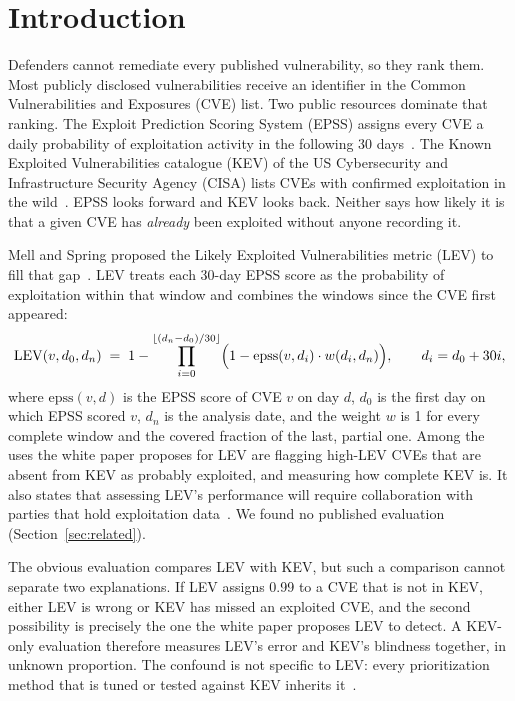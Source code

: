 
\section{Introduction}\label{sec:intro}

Defenders cannot remediate every published vulnerability, so they rank them.
Most publicly disclosed vulnerabilities receive an identifier in the Common
Vulnerabilities and Exposures (CVE) list.
Two public resources dominate that ranking. The Exploit Prediction Scoring
System (EPSS) assigns every CVE a daily probability of exploitation activity
in the following 30 days~\cite{jacobs2021epss,jacobs2023epssv3}. The
Known Exploited Vulnerabilities catalogue (KEV) of the US Cybersecurity and
Infrastructure Security Agency (CISA) lists CVEs with confirmed exploitation
in the wild~\cite{cisa2022kev}. EPSS looks forward and KEV looks back. Neither
says how likely it is that a given CVE has \emph{already} been exploited
without anyone recording it.

Mell and Spring proposed the Likely Exploited Vulnerabilities metric (LEV) to
fill that gap~\cite{mell2025lev}. LEV treats each 30-day EPSS score as the
probability of exploitation within that window and combines the windows since
the CVE first appeared:
\begin{equation}\label{eq:lev}
\mathrm{LEV}(v, d_0, d_n) \;=\; 1 - \prod_{i=0}^{\lfloor (d_n - d_0)/30 \rfloor}
\Bigl(1 - \mathrm{epss}(v, d_i)\cdot w(d_i, d_n)\Bigr),
\qquad d_i = d_0 + 30i,
\end{equation}
where $\mathrm{epss}(v,d)$ is the EPSS score of CVE $v$ on day $d$, $d_0$ is
the first day on which EPSS scored $v$, $d_n$ is the analysis date, and the
weight $w$ is 1 for every complete window and the covered fraction of the
last, partial one. Among the uses the white paper proposes for LEV are
flagging high-LEV CVEs that are absent from KEV as probably exploited, and
measuring how complete KEV is. It also states that assessing LEV's performance will require
collaboration with parties that hold exploitation data~\cite{mell2025lev}. We
found no published evaluation (Section~\ref{sec:related}).

The obvious evaluation compares LEV with KEV, but such a comparison cannot
separate two explanations. If LEV assigns 0.99 to a CVE that is not in KEV,
either LEV is wrong or KEV has missed an exploited CVE, and the second
possibility is precisely the one the white paper proposes LEV to detect. A
KEV-only evaluation therefore measures LEV's error and KEV's blindness
together, in unknown proportion. The confound is not specific to LEV: every
prioritization method that is tuned or tested against KEV inherits
it~\cite{shimizu2026chaining,sherif2026kri,motamedi2026threatlens}.

